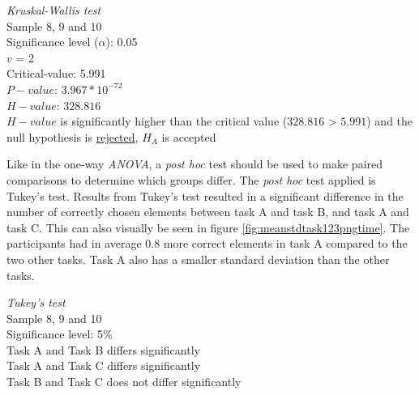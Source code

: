  \begin{center}
	\begin{tcolorbox}[width=0.8\textwidth]
		\centering
		\textit{Kruskal-Wallis test}\\
		Sample 8, 9 and 10\\[0.5cm]
		
		Significance level ($\alpha$): 0.05 \\
		$v$ = 2\\ %
		Critical-value:  5.991\\[0.2cm] %
		$P-value$: $3.967* 10^{-72}$ \\
		$H-value$: $328.816$ \\
		
		$H-value$ is significantly higher than the critical value ($328.816$ > $5.991$) and the null hypothesis is \underline{rejected}, $H_A$ is accepted\\[0.5cm]
	\end{tcolorbox} 
\end{center}
\vspace{0.3cm}

Like in the one-way \textit{ANOVA}, a \textit{post hoc} test should be used to make paired comparisons to determine which groups differ. The \textit{post hoc} test applied is Tukey's test. Results from Tukey's test resulted in a significant difference in the number of correctly chosen elements between task A and task B, and task A and task C. This can also visually be seen in figure \ref{fig:meanstdtask123pngtime}. The participants had in average 0.8 more correct elements in task A compared to the two other tasks. Task A also has a smaller standard deviation than the other tasks. \\[0.2cm]

 \begin{center}
	\begin{tcolorbox}[width=0.8\textwidth]
		\centering
		\textit{Tukey's test}\\
		Sample 8, 9 and 10 \\
		Significance level: 5\%  \\[0.5cm]
		
		Task A and Task B differs significantly \\
		Task A and Task C differs significantly \\
		Task B and Task C does not differ significantly \\[0.2cm]
	\end{tcolorbox} 
\end{center}

